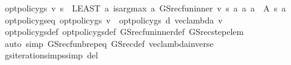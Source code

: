 \begin{isabellebody}
\isamarkupfalse%
\ {\isachardoublequoteopen}opt{\isacharunderscore}{\kern0pt}policy{\isacharunderscore}{\kern0pt}gs\ v\ s\ {\isacharequal}{\kern0pt}\ {\isacharparenleft}{\kern0pt}LEAST\ a{\isachardot}{\kern0pt}\ is{\isacharunderscore}{\kern0pt}arg{\isacharunderscore}{\kern0pt}max\ {\isacharparenleft}{\kern0pt}{\isasymlambda}a{\isachardot}{\kern0pt}\ GS{\isacharunderscore}{\kern0pt}rec{\isacharunderscore}{\kern0pt}fun{\isacharunderscore}{\kern0pt}inner\ v\ s\ a{\isacharparenright}{\kern0pt}\ {\isacharparenleft}{\kern0pt}{\isasymlambda}a{\isachardot}{\kern0pt}\ a\ {\isasymin}\ A\ s{\isacharparenright}{\kern0pt}\ a{\isacharparenright}{\kern0pt}{\isachardoublequoteclose}\isanewline
\isanewline
{}\isamarkupfalse%
\ opt{\isacharunderscore}{\kern0pt}policy{\isacharunderscore}{\kern0pt}gs{\isacharunderscore}{\kern0pt}eq{\isacharprime}{\kern0pt}{\isacharcolon}{\kern0pt}\ {\isachardoublequoteopen}opt{\isacharunderscore}{\kern0pt}policy{\isacharunderscore}{\kern0pt}gs\ v\ {\isacharequal}{\kern0pt}\ opt{\isacharunderscore}{\kern0pt}policy{\isacharunderscore}{\kern0pt}gs{\isacharprime}{\kern0pt}\ d\ {\isacharparenleft}{\kern0pt}vec{\isacharunderscore}{\kern0pt}lambda\ v{\isacharparenright}{\kern0pt}{\isachardoublequoteclose}\isanewline
%
\isadelimproof
\ \ %
\endisadelimproof
%
\isatagproof
{}\isamarkupfalse%
\ opt{\isacharunderscore}{\kern0pt}policy{\isacharunderscore}{\kern0pt}gs{\isacharunderscore}{\kern0pt}def\ opt{\isacharunderscore}{\kern0pt}policy{\isacharunderscore}{\kern0pt}gs{\isacharprime}{\kern0pt}{\isacharunderscore}{\kern0pt}def\ GS{\isacharunderscore}{\kern0pt}rec{\isacharunderscore}{\kern0pt}fun{\isacharunderscore}{\kern0pt}inner{\isacharunderscore}{\kern0pt}def\ GS{\isacharunderscore}{\kern0pt}rec{\isacharunderscore}{\kern0pt}step{\isacharunderscore}{\kern0pt}elem\isanewline
\ \ \isamarkupfalse%
\ {\isacharparenleft}{\kern0pt}auto\ simp{\isacharcolon}{\kern0pt}\ GS{\isacharunderscore}{\kern0pt}rec{\isacharunderscore}{\kern0pt}fun\isactrlsub b{\isachardot}{\kern0pt}rep{\isacharunderscore}{\kern0pt}eq\ GS{\isacharunderscore}{\kern0pt}rec{\isacharunderscore}{\kern0pt}def\ vec{\isacharunderscore}{\kern0pt}lambda{\isacharunderscore}{\kern0pt}inverse{\isacharparenright}{\kern0pt}%
\endisatagproof
{\isafoldproof}%
%
\isadelimproof
\isanewline
%
\endisadelimproof
\isanewline
{}\isamarkupfalse%
\ gs{\isacharunderscore}{\kern0pt}iteration{\isachardot}{\kern0pt}simps{\isacharbrackleft}{\kern0pt}simp\ del{\isacharbrackright}{\kern0pt}\isanewline
\isanewline
{}\isamarkupfalse%

\end{isabellebody}
